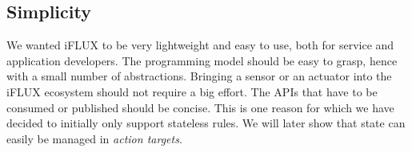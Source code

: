 \subsection{Simplicity}

We wanted iFLUX to be very lightweight and easy to use, both for service and application developers. The programming model should be easy to grasp, hence with a small number of abstractions. Bringing a sensor or an actuator into the iFLUX ecosystem should not require a big effort. The APIs that have to be consumed or published should be concise. This is one reason for which we have decided to initially only support stateless rules. We will later show that state can easily be managed in \emph{action targets}.